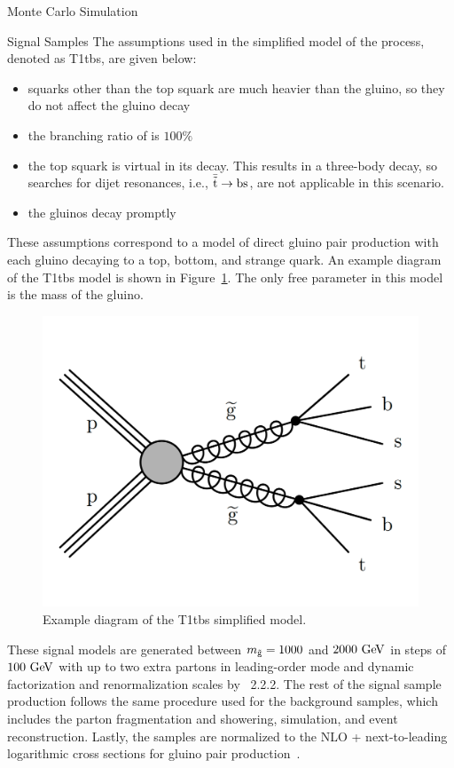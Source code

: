 \begin{section}{Monte Carlo Simulation}
\begin{subsection}{Signal Samples}
The assumptions used in the simplified model of the \rpvDecay process, denoted as T1tbs, are given below:
\begin{itemize}
\item squarks other than the top squark are much heavier than the gluino, so they do not affect the gluino decay
\item the branching ratio of \rpvDecay is $100\%$
\item the top squark is virtual in its decay. This results in a three-body decay, so searches for dijet resonances, i.e., $\bar{\tilde{\mathrm{t}}} \to \mathrm{bs}$, are not applicable in this scenario.
\item the gluinos decay promptly
\end{itemize}

These assumptions correspond to a model of direct gluino pair production with each gluino decaying to a top, bottom, and strange quark. 
An example diagram of the T1tbs model is shown in Figure~\ref{fig:T1tbs_diagram}.
The only free parameter in this model is the mass of the gluino.

\begin{figure}[tbp!]
\begin{center}
\includegraphics[angle=0,width=0.60\columnwidth]{fig/T1tbs_diagram.png}
\end{center}
\caption{Example diagram of the T1tbs simplified model.}
\label{fig:T1tbs_diagram}
\end{figure}

These signal models are generated between $m_{\tilde{\mathrm{g}}} = 1000$ and $2000~\mathrm{Ge\kern -0.1em V}$ in steps of $100~\mathrm{Ge\kern -0.1em V}$ with up to two extra partons in leading-order mode and dynamic factorization and renormalization scales by \MGatNLO~2.2.2.
The rest of the signal sample production follows the same procedure used for the background samples, which includes the parton fragmentation and showering, simulation, and event reconstruction.
Lastly, the samples are normalized to the NLO + next-to-leading logarithmic cross sections for gluino pair production~\cite{XSecgluinogluino}.


\end{subsection}
\end{section}
